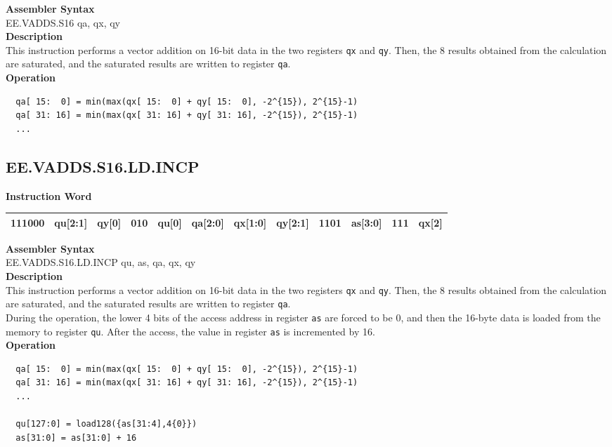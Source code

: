 \textbf{Assembler Syntax} \\
EE.VADDS.S16 qa, qx, qy \\
\textbf{Description} \\
This instruction performs a vector addition on 16-bit data in the two registers \lstinline{qx} and \lstinline{qy}. Then, the 8 results obtained from the calculation are saturated, and the saturated results are written to register \lstinline{qa}.\\
\textbf{Operation}
\begin{lstlisting}
  qa[ 15:  0] = min(max(qx[ 15:  0] + qy[ 15:  0], -2^{15}), 2^{15}-1)
  qa[ 31: 16] = min(max(qx[ 31: 16] + qy[ 31: 16], -2^{15}), 2^{15}-1)
  ...
\end{lstlisting}

\clearpage
\subsection{EE.VADDS.S16.LD.INCP}\label{instruction:EEVADDSS16LDINCP}
\setlength\tabcolsep{6pt}
\textbf{Instruction Word} \\
\begin{tabular}{|c|c|c|c|c|c|c|c|c|c|c|c|}
	\hline
	111000 & qu[2:1] & qy[0] & 010 & qu[0] & qa[2:0] & qx[1:0] & qy[2:1] & 1101 & as[3:0] & 111 & qx[2] \\
	\hline
\end{tabular}

\textbf{Assembler Syntax} \\
EE.VADDS.S16.LD.INCP qu, as, qa, qx, qy \\
\textbf{Description} \\
This instruction performs a vector addition on 16-bit data in the two registers \lstinline{qx} and \lstinline{qy}. Then, the 8 results obtained from the calculation are saturated, and the saturated results are written to register \lstinline{qa}. \\ During the operation, the lower 4 bits of the access address in register \lstinline{as} are forced to be 0, and then the 16-byte data is loaded from the memory to register \lstinline{qu}. After the access, the value in register \lstinline{as} is incremented by 16.\\
\textbf{Operation}
\begin{lstlisting}
  qa[ 15:  0] = min(max(qx[ 15:  0] + qy[ 15:  0], -2^{15}), 2^{15}-1)
  qa[ 31: 16] = min(max(qx[ 31: 16] + qy[ 31: 16], -2^{15}), 2^{15}-1)
  ...

  qu[127:0] = load128({as[31:4],4{0}})
  as[31:0] = as[31:0] + 16
\end{lstlisting}

